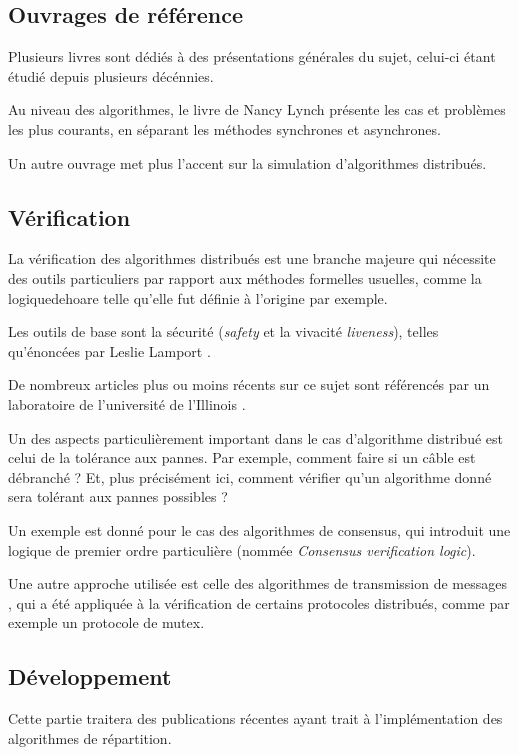 \subsection{Ouvrages de référence}
Plusieurs livres sont dédiés à des présentations générales du sujet, celui-ci étant étudié depuis plusieurs décénnies.

Au niveau des algorithmes, le livre de Nancy Lynch \cite{lynch1996distributed} présente les cas et problèmes les plus courants, en séparant les méthodes synchrones et asynchrones. 

Un autre ouvrage \cite{attiya2004distributed} met plus l'accent sur la simulation d'algorithmes distribués.

\subsection{Vérification}
La vérification des algorithmes distribués est une branche majeure qui nécessite des outils particuliers par rapport aux méthodes formelles usuelles, comme la \gls{logiquedehoare} telle qu'elle fut définie à l'origine par exemple.

Les outils de base sont la sécurité (\textit{safety} et la vivacité \textit{liveness}), telles qu'énoncées par Leslie Lamport \cite{lamport1977proving}.

De nombreux articles plus ou moins récents sur ce sujet sont référencés par un laboratoire de l'université de l'Illinois \cite{formaldistributed}.

Un des aspects particulièrement important dans le cas d'algorithme distribué est celui de la tolérance aux pannes. Par exemple, comment faire si un câble est débranché ? Et, plus précisément ici, comment vérifier qu'un algorithme donné sera tolérant aux pannes possibles ? 

Un exemple est donné \cite{mcmillan2014verification} pour le cas des algorithmes de consensus, qui introduit une logique de premier ordre particulière (nommée \textit{Consensus verification logic}).

Une autre approche utilisée est celle des algorithmes de transmission de messages \cite{jezequel2014message}, qui a été appliquée à la vérification de certains protocoles distribués, comme par exemple un protocole de \gls{mutex}.

\subsection{Développement}
Cette partie traitera des publications récentes ayant trait à l'implémentation des algorithmes de répartition.

